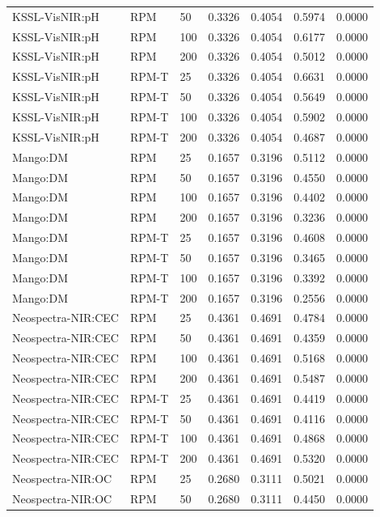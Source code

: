 \begin{tabular}{lllllll}
KSSL-VisNIR:pH & RPM & 50 & 0.3326 & 0.4054 & 0.5974 & 0.0000 \\
KSSL-VisNIR:pH & RPM & 100 & 0.3326 & 0.4054 & 0.6177 & 0.0000 \\
KSSL-VisNIR:pH & RPM & 200 & 0.3326 & 0.4054 & 0.5012 & 0.0000 \\
KSSL-VisNIR:pH & RPM-T & 25 & 0.3326 & 0.4054 & 0.6631 & 0.0000 \\
KSSL-VisNIR:pH & RPM-T & 50 & 0.3326 & 0.4054 & 0.5649 & 0.0000 \\
KSSL-VisNIR:pH & RPM-T & 100 & 0.3326 & 0.4054 & 0.5902 & 0.0000 \\
KSSL-VisNIR:pH & RPM-T & 200 & 0.3326 & 0.4054 & 0.4687 & 0.0000 \\
Mango:DM & RPM & 25 & 0.1657 & 0.3196 & 0.5112 & 0.0000 \\
Mango:DM & RPM & 50 & 0.1657 & 0.3196 & 0.4550 & 0.0000 \\
Mango:DM & RPM & 100 & 0.1657 & 0.3196 & 0.4402 & 0.0000 \\
Mango:DM & RPM & 200 & 0.1657 & 0.3196 & 0.3236 & 0.0000 \\
Mango:DM & RPM-T & 25 & 0.1657 & 0.3196 & 0.4608 & 0.0000 \\
Mango:DM & RPM-T & 50 & 0.1657 & 0.3196 & 0.3465 & 0.0000 \\
Mango:DM & RPM-T & 100 & 0.1657 & 0.3196 & 0.3392 & 0.0000 \\
Mango:DM & RPM-T & 200 & 0.1657 & 0.3196 & 0.2556 & 0.0000 \\
Neospectra-NIR:CEC & RPM & 25 & 0.4361 & 0.4691 & 0.4784 & 0.0000 \\
Neospectra-NIR:CEC & RPM & 50 & 0.4361 & 0.4691 & 0.4359 & 0.0000 \\
Neospectra-NIR:CEC & RPM & 100 & 0.4361 & 0.4691 & 0.5168 & 0.0000 \\
Neospectra-NIR:CEC & RPM & 200 & 0.4361 & 0.4691 & 0.5487 & 0.0000 \\
Neospectra-NIR:CEC & RPM-T & 25 & 0.4361 & 0.4691 & 0.4419 & 0.0000 \\
Neospectra-NIR:CEC & RPM-T & 50 & 0.4361 & 0.4691 & 0.4116 & 0.0000 \\
Neospectra-NIR:CEC & RPM-T & 100 & 0.4361 & 0.4691 & 0.4868 & 0.0000 \\
Neospectra-NIR:CEC & RPM-T & 200 & 0.4361 & 0.4691 & 0.5320 & 0.0000 \\
Neospectra-NIR:OC & RPM & 25 & 0.2680 & 0.3111 & 0.5021 & 0.0000 \\
Neospectra-NIR:OC & RPM & 50 & 0.2680 & 0.3111 & 0.4450 & 0.0000 \\

\end{tabular}
